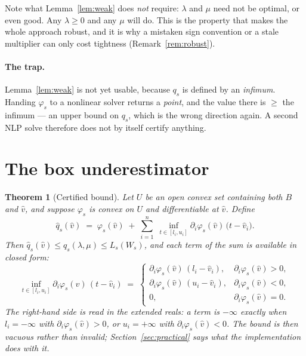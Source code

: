 \documentclass[11pt]{article}
\theoremstyle{plain}
\newtheorem{theorem}[lemma]{Theorem}
\theoremstyle{remark}
\newcommand{\W}{W}
\newcommand{\vhat}{\hat{v}}
\newcommand{\qhat}{\hat{q}}
\begin{document}
Note what Lemma~\ref{lem:weak} does \emph{not} require: $\lambda$ and $\mu$ need
not be optimal, or even good.  Any $\lambda \ge 0$ and any $\mu$ will do.  This
is the property that makes the whole approach robust, and it is why a mistaken
sign convention or a stale multiplier can only cost tightness
(Remark~\ref{rem:robust}).

\paragraph{The trap.}
Lemma~\ref{lem:weak} is not yet usable, because $q_s$ is defined by an
\emph{infimum}.  Handing $\varphi_s$ to a nonlinear solver returns a
\emph{point}, and the value there is $\ge$ the infimum --- an upper bound on
$q_s$, which is the wrong direction again.  A second NLP solve therefore does
not by itself certify anything.

\section{The box underestimator}

\begin{theorem}[Certified bound]\label{thm:main}
Let $U$ be an open convex set containing both $B$ and $\vhat$, and suppose
$\varphi_s$ is convex on $U$ and differentiable at $\vhat$.  Define
\begin{equation}\label{eq:qhat}
  \qhat_s(\vhat) \;=\; \varphi_s(\vhat)
    \;+\; \sum_{i=1}^{n} \; \inf_{t \in [l_i,u_i]}
          \partial_i \varphi_s(\vhat)\,\bigl(t - \vhat_i\bigr).
\end{equation}
Then $\qhat_s(\vhat) \le q_s(\lambda,\mu) \le L_s(\W_s)$, and each term of the
sum is available in closed form:
\begin{equation}\label{eq:closed}
  \inf_{t \in [l_i,u_i]} \partial_i \varphi_s(\vhat)\,(t - \vhat_i)
  \;=\;
  \begin{cases}
    \partial_i \varphi_s(\vhat)\,(l_i - \vhat_i), & \partial_i \varphi_s(\vhat) > 0,\\[2pt]
    \partial_i \varphi_s(\vhat)\,(u_i - \vhat_i), & \partial_i \varphi_s(\vhat) < 0,\\[2pt]
    0, & \partial_i \varphi_s(\vhat) = 0.
  \end{cases}
\end{equation}
The right-hand side is read in the extended reals: a term is $-\infty$ exactly
when $l_i = -\infty$ with $\partial_i \varphi_s(\vhat) > 0$, or $u_i = +\infty$
with $\partial_i \varphi_s(\vhat) < 0$.  The bound is then vacuous rather than
invalid; Section~\ref{sec:practical} says what the implementation does with it.
\end{theorem}
\end{document}
